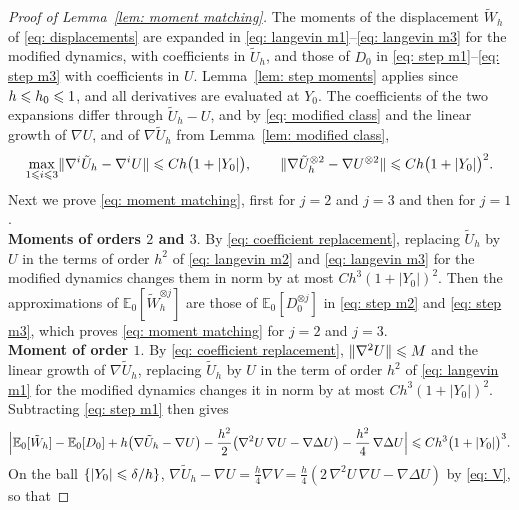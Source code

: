 \begin{proof}[Proof of Lemma~\ref{lem: moment matching}]
    The moments of the displacement $\tilde W_h$ of \eqref{eq: displacements} are expanded in \eqref{eq: langevin m1}--\eqref{eq: langevin m3} for the modified dynamics, with coefficients in $\tilde U_h$, and those of $D_0$ in \eqref{eq: step m1}--\eqref{eq: step m3} with coefficients in $U$. Lemma~\ref{lem: step moments} applies since $h \leqslant h_0 \leqslant 1$, and all derivatives are evaluated at $Y_0$. The coefficients of the two expansions differ through $\tilde U_h - U$, and by \eqref{eq: modified class} and the linear growth of $\nabla U$, and of $\nabla \tilde U_h$ from Lemma~\ref{lem: modified class},
    \begin{equation}
        \max_{1 \leqslant i \leqslant 3} \lVert \nabla^i \tilde U_h - \nabla^i U \rVert \leqslant C h \bigl( 1+|Y_0| \bigr) , \qquad \lVert \nabla \tilde U_h^{\otimes 2} - \nabla U^{\otimes 2} \rVert \leqslant C h \bigl( 1+|Y_0| \bigr)^2 .
        \label{eq: coefficient replacement}
    \end{equation}
    Next we prove \eqref{eq: moment matching}, first for $j = 2$ and $j = 3$ and then for $j = 1$.\\[6pt]
    \textbf{Moments of orders $2$ and $3$}. By \eqref{eq: coefficient replacement}, replacing $\tilde U_h$ by $U$ in the terms of order $h^2$ of \eqref{eq: langevin m2} and \eqref{eq: langevin m3} for the modified dynamics changes them in norm by at most $C h^3 (1+|Y_0|)^2$. Then the approximations of $\mathbb E_0[\tilde W_h^{\otimes j}]$ are those of $\mathbb E_0[D_0^{\otimes j}]$ in \eqref{eq: step m2} and \eqref{eq: step m3}, which proves \eqref{eq: moment matching} for $j = 2$ and $j = 3$.\\[6pt]
    \textbf{Moment of order $1$}. By \eqref{eq: coefficient replacement}, $\lVert \nabla^2 U \rVert \leqslant M$ and the linear growth of $\nabla \tilde U_h$, replacing $\tilde U_h$ by $U$ in the term of order $h^2$ of \eqref{eq: langevin m1} for the modified dynamics changes it in norm by at most $C h^3 (1+|Y_0|)^2$. Subtracting \eqref{eq: step m1} then gives
    \begin{equation}
        \Bigl| \mathbb E_0[\tilde W_h] - \mathbb E_0[D_0] + h \bigl( \nabla \tilde U_h - \nabla U \bigr) - \frac{h^2}{2} \bigl( \nabla^2 U\, \nabla U - \nabla \Delta U \bigr) - \frac{h^2}{4}\, \nabla \Delta U \Bigr| \leqslant C h^3 \bigl( 1+|Y_0| \bigr)^3 .
        \label{eq: m1 difference}
    \end{equation}
    On the ball $\{|Y_0| \leqslant \delta/h\}$, $\nabla \tilde U_h - \nabla U = \frac h4 \nabla V = \frac h4 ( 2\, \nabla^2 U\, \nabla U - \nabla \Delta U )$ by \eqref{eq: V}, so that

\end{proof}

